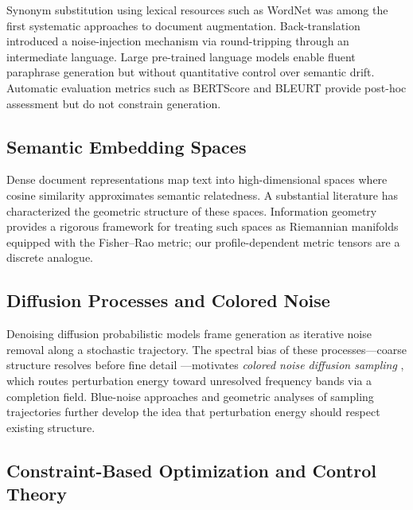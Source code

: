 \documentclass[12pt, a4paper]{article}
\theoremstyle{plain}
\theoremstyle{definition}
\theoremstyle{remark}
\begin{document}
Synonym substitution using lexical resources such as WordNet
\cite{miller1995wordnet} was among the first systematic approaches to document
augmentation.  Back-translation \cite{sennrich2016backtranslation} introduced
a noise-injection mechanism via round-tripping through an intermediate language.
Large pre-trained language models \cite{raffel2020t5, brown2020gpt3} enable
fluent paraphrase generation but without quantitative control over semantic
drift.  Automatic evaluation metrics such as BERTScore \cite{zhang2020bertscore}
and BLEURT \cite{sellam2020bleurt} provide post-hoc assessment but do not
constrain generation.

\subsection{Semantic Embedding Spaces}

Dense document representations \cite{mikolov2013efficient, devlin2019bert,
reimers2019sentencebert} map text into high-dimensional spaces where cosine
similarity approximates semantic relatedness.  A substantial literature
\cite{ethayarajh2019contextual, rahaman2019spectralbias} has characterized
the geometric structure of these spaces.  Information geometry
\cite{amari2016information} provides a rigorous framework for treating such
spaces as Riemannian manifolds equipped with the Fisher--Rao metric; our
profile-dependent metric tensors are a discrete analogue.

\subsection{Diffusion Processes and Colored Noise}

Denoising diffusion probabilistic models \cite{ho2020ddpm} frame generation as
iterative noise removal along a stochastic trajectory.  The spectral bias of
these processes---coarse structure resolves before fine detail
\cite{rahaman2019spectralbias, falck2025fourierspace}---motivates
\emph{colored noise diffusion sampling} \cite{davidson2026colorednoisediffusionsampling},
which routes perturbation energy toward unresolved frequency bands via a
completion field.  Blue-noise approaches \cite{huang2024bluenoise} and geometric
analyses of sampling trajectories \cite{wang2025rotationaltrajectories} further
develop the idea that perturbation energy should respect existing structure.

\subsection{Constraint-Based Optimization and Control Theory}
\end{document}
